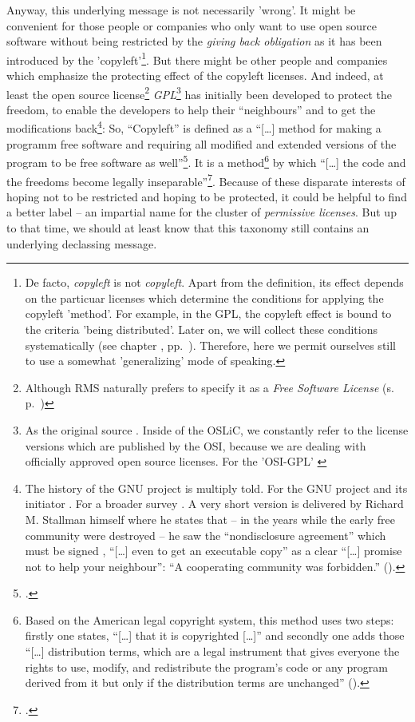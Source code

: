 Anyway, this underlying message is not necessarily 'wrong'. It might be
convenient for those people or companies who only want to use open source
software without being restricted by the \emph{giving back obligation} as it has
been introduced by the 'copyleft'\footnote{De facto, \emph{copyleft} is not
\emph{copyleft}. Apart from the definition, its effect depends on the
par\-ti\-cu\-ar licenses which determine the conditions for applying the
copyleft 'method'. For example, in the GPL, the copyleft effect is bound to the
criteria 'being distributed'. Later on, we will collect these conditions
systematically (see chapter \emph{}, pp.\
\pageref{sec:OSUCdeduction}). Therefore, here we permit ourselves still to use a
somewhat 'generalizing' mode of speaking.}. But there might be other people and
companies which emphasize the protecting effect of the copyleft licenses. And
indeed, at least the open source license\footnote{Although RMS naturally prefers
to specify it as a \emph{Free Software License} (s. p.\ \pageref{RmsFsPriority})
} \emph{GPL}\footnote{As the original source \cite[cf.][\nopage
wp]{Gpl20FsfLicense1991a}. Inside of the OSLiC, we constantly refer to the
license versions which are published by the OSI, because we are dealing with
officially approved open source licenses. For the 'OSI-GPL' \cite[cf.][\nopage
wp]{Gpl20OsiLicense1991a}} has initially been developed to protect the freedom,
to enable the developers to help their \enquote{neighbours} and to get the
modifications back\footnote{The history of the GNU project is multiply told. For
the GNU project and its initiator \cite[cf.\ pars pro toto][\nopage
passim]{Williams2002a}. For a broader survey \cite[cf.\ pars pro toto][\nopage
passim]{Moody2001a}. A very short version is delivered by Richard M. Stallman
himself where he states that -- in the years while the early free community were
destroyed -- he saw the \enquote{nondisclosure agreement} which must be signed ,
\enquote{[\ldots] even to get an executable copy} as a clear \enquote{[\ldots]
promise not to help your neighbour}: \enquote{A cooperating community was
forbidden.} (\cite[cf.][16]{Stallman1999a}).}: So, \enquote{Copyleft} is defined
as a \enquote{[\ldots] method for making a programm free software and requiring
all modified and extended versions of the program to be free software as
well}\footcite[cf.][89]{Stallman1996c}. It is a method\footnote{Based on the
American legal copyright system, this method uses two steps: firstly one states,
\enquote{[\ldots] that it is copyrighted [\ldots]} and secondly one adds those
\enquote{[\ldots] distribution terms, which are a legal instrument that gives
everyone the rights to use, modify, and redistribute the program's code or any
program derived from it but only if the distribution terms are unchanged}
(\cite[cf.][89]{Stallman1996c}).} by which \enquote{[\ldots] the code and the
freedoms become legally inseparable}\footcite[cf.][89]{Stallman1996c}. Because
of these disparate interests of hoping not to be restricted and hoping to be
protected, it could be helpful to find a better label -- an impartial name for
the cluster of \emph{permissive licenses}. But up to that time, we should at
least know that this taxonomy still contains an underlying declassing message.

